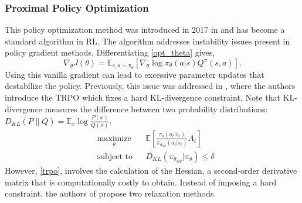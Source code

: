 \subsubsection{Proximal Policy Optimization}
This policy optimization method was introduced in 2017 in \cite{ppo} and has become a standard algorithm in \ac{RL}.
The algorithm addresses instability issues present in policy gradient methods.
Differentiating \eqref{opt_theta} gives,
\begin{equation}
    \nabla_{\theta}J(\theta) = \mathbb{E}_{s,a\sim\pi_{\theta}} [\nabla_{\theta} \log \pi_{\theta}(a|s)Q^{\pi}(s,a)].
\end{equation}
Using this vanilla gradient can lead to excessive parameter updates that destabilize the policy.
Previously, this issue was addressed in \cite{schulman_trust_2017}, where the authors introduce the \ac{TRPO} which fixes a hard KL-divergence constraint.
Note that KL-divergence measures the difference between two probability distributions: $D_{KL}(P \| Q) = \mathbb{E}_{x} \log \frac{P(x)}{Q(x)}$.
\begin{equation}
\begin{aligned}
& \underset{\theta}{\text{maximize}} & & \mathbb{E} \left[ \frac{\pi_{\theta}(a_t|s_t)}{\pi_{\theta_{old}}(a_t|s_t)} A_t \right] \ \\
& \text{subject to} & & D_{KL} (\pi_{\theta_{old}} | \pi_{\theta}) \leq \delta
\end{aligned}
\label{trpo}
\end{equation}
However, \eqref{trpo}, involves the calculation of the Hessian, a second-order derivative matrix that is computationally costly to obtain.
Instead of imposing a hard constraint, the authors of \cite{ppo} propose two relaxation methods.
